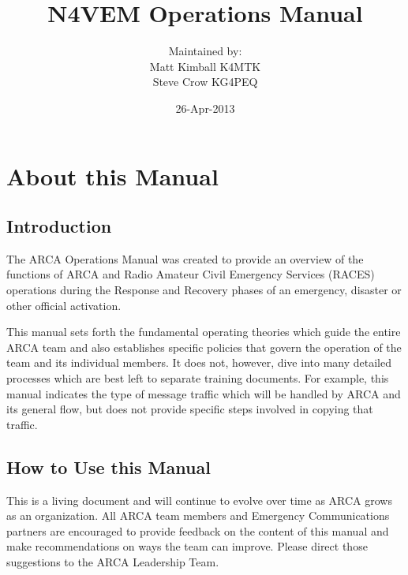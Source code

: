 \documentclass[pdflatex,letterpaper,twoside,12pt]{book}
\title             {N4VEM Operations Manual}
\author            {Maintained by:\\Matt Kimball K4MTK\\Steve Crow KG4PEQ}
\date              {26-Apr-2013}
\begin{document}
\arcaTitlePage
\skipToTOC
\arcaTOC


\chapter{About this Manual}

\section{Introduction}

The ARCA Operations Manual was created to provide an overview of the functions of ARCA and Radio Amateur Civil Emergency Services (RACES) operations during the Response and Recovery phases of an emergency, disaster or other official activation.

This manual sets forth the fundamental operating theories which guide the entire ARCA team and also establishes specific policies that govern the operation of the team and its individual members.  It does not, however, dive into many detailed processes which are best left to separate training documents.  For example, this manual indicates the type of message traffic which will be handled by ARCA and its general flow, but does not provide specific steps involved in copying that traffic.


\section{How to Use this Manual}

This is a living document and will continue to evolve over time as ARCA grows as an organization.  All ARCA team members and Emergency Communications partners are encouraged to provide feedback on the content of this manual and make recommendations on ways the team can improve.  Please direct those suggestions to the ARCA Leadership Team.
\end{document}

